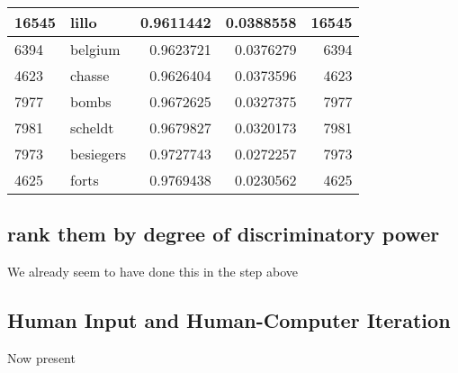 \documentclass{article}\usepackage[]{graphicx}\usepackage[]{color}
\newenvironment{knitrout}{}{} %
\begin{document}
\begin{knitrout}
\begin{tabular}{l|l|r|r|r}
\hline
16545 & lillo & 0.9611442 & 0.0388558 & 16545\\
\hline
6394 & belgium & 0.9623721 & 0.0376279 & 6394\\
\hline
4623 & chasse & 0.9626404 & 0.0373596 & 4623\\
\hline
7977 & bombs & 0.9672625 & 0.0327375 & 7977\\
\hline
7981 & scheldt & 0.9679827 & 0.0320173 & 7981\\
\hline
7973 & besiegers & 0.9727743 & 0.0272257 & 7973\\
\hline
4625 & forts & 0.9769438 & 0.0230562 & 4625\\
\hline
\end{tabular}


\end{knitrout}

\subsection{rank them by degree of discriminatory power}
We already seem to have done this in the step above
\subsection{Human Input and Human-Computer Iteration}
Now present
\end{document}
